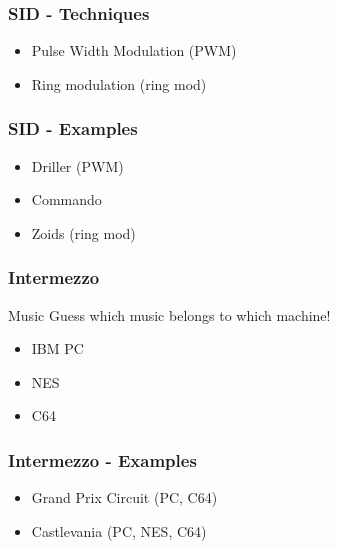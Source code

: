 
\begin{frame}
\frametitle{SID - Techniques}

\begin{itemize}
\item Pulse Width Modulation (PWM)
\item Ring modulation (ring mod)
\end{itemize}

\end{frame}


\begin{frame}
\frametitle{SID - Examples}

\begin{itemize}
\item Driller (PWM)
\item Commando
\item Zoids (ring mod)
\end{itemize}

\end{frame}


\begin{frame}
\frametitle{Intermezzo}

\begin{block}{Music}
Guess which music belongs to which machine!
\end{block}

\begin{itemize}
\item IBM PC
\item NES
\item C64
\end{itemize}

\end{frame}


\begin{frame}
\frametitle{Intermezzo - Examples}

\begin{itemize}
\item Grand Prix Circuit (PC, C64)
\item Castlevania (PC, NES, C64)
\end{itemize}

\end{frame}

